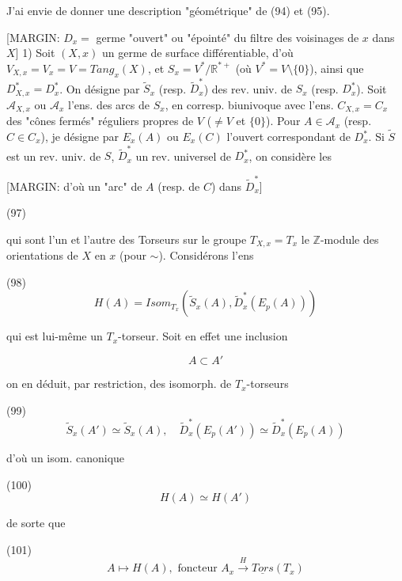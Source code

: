 J'ai envie de donner une description "géométrique" de (94) et (95).

[MARGIN: $D_x=$ germe "ouvert" ou "épointé" du filtre des voisinages de $x$ dans $X$]
1) Soit $(X,x)$ un germe de surface différentiable, d'où $V_{X,x} = V_x = V = Tang_x(X)$, et $S_x = V^* / \mathbb{R}^{*+}$ (où $V^* = V \setminus \{0\}$), ainsi que $D_{X,x}^* = D_x^*$. On désigne par $\tilde{S}_x$ (resp. $\tilde{D}_x^*$) des rev. univ. de $S_x$ (resp. $D_x^*$). Soit $\mathcal{A}_{X,x}$ ou $\mathcal{A}_x$ l'ens. des arcs de $S_x$, en corresp. biunivoque avec l'ens. $C_{X,x} = C_x$ des "cônes fermés" réguliers propres de $V$ ($\neq V$ et $\{0\}$). Pour $A \in \mathcal{A}_x$ (resp. $C \in C_x$), je désigne par $E_x(A)$ ou $E_x(C)$ l'ouvert correspondant de $D_x^*$. Si $\tilde{S}$ est un rev. univ. de $S$, $\tilde{D}_x^*$ un rev. universel de $D_x^*$, on considère les

[MARGIN: d'où un "arc" de $A$ (resp. de $C$) dans $\tilde{D}_x^*$]

\newpage


(97) 

qui sont l'un et l'autre des Torseurs sur le groupe $T_{X,x} = T_x$ le $\mathbb{Z}$-module des orientations de $X$ en $x$ (pour $\sim$). Considérons l'ens

(98) $$H(A) = Isom_{T_x}(\tilde{S}_x(A), \tilde{D}_x^*(E_p(A)))$$

qui est lui-même un $T_x$-torseur. Soit en effet une inclusion

$$A \subset A'$$

on en déduit, par restriction, des isomorph. de $T_x$-torseurs

(99) $$\tilde{S}_x(A') \simeq \tilde{S}_x(A), \quad \tilde{D}_x^*(E_p(A')) \simeq \tilde{D}_x^*(E_p(A))$$

d'où un isom. canonique

(100) $$H(A) \simeq H(A')$$

de sorte que 

(101) $$A \mapsto H(A), \text{ foncteur } A_x \xrightarrow{H} \underline{Tors}(T_x)$$

